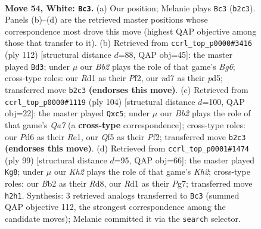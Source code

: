 \documentclass[11pt]{article}
\begin{document}
\clearpage

\begin{figure}[p]\centering
\begin{subfigure}{0.46\textwidth}\centering
\resizebox{\linewidth}{!}{%
\newchessgame
\chessboard[
  setfen={3q3k/1b1n1p2/3P1n2/5Q2/p1p4P/5pP1/PB5K/3R4 w - - 8 54},
  showmover=false,
  pgfstyle=straightmove, color=movearrow, markmove={b2-c3}
]}
\caption{}
\end{subfigure}\hfill
\begin{subfigure}{0.46\textwidth}\centering
\resizebox{\linewidth}{!}{%
\newchessgame
\chessboard[
  setfen={2k5/2p3p1/2Qnq1Bp/3p3P/3P4/5P2/5PK1/8 w - - 15 57},
  showmover=false,
  pgfstyle=straightmove, color=movearrow, markmove={g6-d3}
]}
\caption{}
\end{subfigure}
\\[4pt]
\begin{subfigure}{0.46\textwidth}\centering
\resizebox{\linewidth}{!}{%
\newchessgame
\chessboard[
  setfen={8/Q1nq3k/6p1/P1pb3p/8/6PP/5P2/4R1K1 w - - 0 53},
  showmover=false,
  pgfstyle=straightmove, color=movearrow, markmove={a7-c5}
]}
\caption{}
\end{subfigure}\hfill
\begin{subfigure}{0.46\textwidth}\centering
\resizebox{\linewidth}{!}{%
\newchessgame
\chessboard[
  setfen={3r4/1p4pk/7p/4q3/3NP3/pPBK3Q/P7/8 b - - 15 50},
  showmover=false,
  pgfstyle=straightmove, color=movearrow, markmove={h7-g8}
]}
\caption{}
\end{subfigure}
\caption{\textbf{Move 54, White: \texttt{Bc3}.} (a) Our position; Melanie plays \texttt{Bc3} (\texttt{b2c3}). Panels (b)--(d) are the retrieved master positions whose correspondence most drove this move (highest QAP objective among those that transfer to it). (b) Retrieved from \texttt{ccrl\_top\_p0000\#3416} (ply 112) [structural distance $d$=88, QAP obj=45]: the master played \texttt{Bd3}; under $\mu$ our \emph{Bb2} plays the role of that game's \emph{Bg6}; cross-type roles: our \emph{R}d1 as their \emph{P}f2, our \emph{n}d7 as their \emph{p}d5; transferred move \texttt{b2c3} \textbf{(endorses this move)}. (c) Retrieved from \texttt{ccrl\_top\_p0000\#1119} (ply 104) [structural distance $d$=100, QAP obj=22]: the master played \texttt{Qxc5}; under $\mu$ our \emph{Bb2} plays the role of that game's \emph{Qa7} (a \textbf{cross-type} correspondence); cross-type roles: our \emph{P}d6 as their \emph{R}e1, our \emph{Q}f5 as their \emph{P}f2; transferred move \texttt{b2c3} \textbf{(endorses this move)}. (d) Retrieved from \texttt{ccrl\_top\_p0001\#1474} (ply 99) [structural distance $d$=95, QAP obj=66]: the master played \texttt{Kg8}; under $\mu$ our \emph{Kh2} plays the role of that game's \emph{Kh2}; cross-type roles: our \emph{B}b2 as their \emph{R}d8, our \emph{R}d1 as their \emph{P}g7; transferred move \texttt{h2h1}. Synthesis: 3 retrieved analogs transferred to \texttt{Bc3} (summed QAP objective 112, the strongest correspondence among the candidate moves); Melanie committed it via the \texttt{search} selector.}
\label{fig:thought-m106}
\end{figure}
\end{document}
